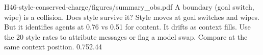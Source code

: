 {H46-style-conserved-charge/figures/summary_obs.pdf}
{A boundary (goal switch, wipe) is a collision. Does style survive it?}
{Style moves at goal switches and wipes. But it identifies agents at 0.76 vs 0.51 for content. It drifts as context fills.}
{Use the 20 style rates to attribute messages or flag a model swap. Compare at the same context position.}
{0.75}{2.44}
